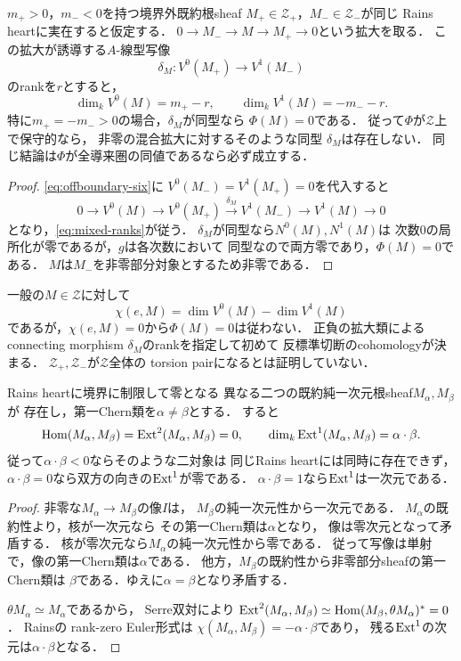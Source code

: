 \begin{proposition}[正負の混合拡大と相殺]
\label{prop:mixed-sign-cancellation}
$m_+>0$，$m_-<0$を持つ境界外既約根sheaf
$M_+\in\mathcal Z_+$，$M_-\in\mathcal Z_-$が同じ
Rains heartに実在すると仮定する．
$0\to M_-\to M\to M_+\to0$という拡大を取る．
この拡大が誘導する$A$-線型写像
\[
 \delta_M:V^0(M_+)\longrightarrow V^1(M_-)
\]
のrankを$r$とすると，
\begin{equation}\label{eq:mixed-ranks}
 \dim_kV^0(M)=m_+-r,\qquad
 \dim_kV^1(M)=-m_--r .
\end{equation}
特に$m_+=-m_->0$の場合，$\delta_M$が同型なら
$\Phi(M)=0$である．
従って$\Phi$が$\mathcal Z$上で保守的なら，
非零の混合拡大に対するそのような同型
$\delta_M$は存在しない．
同じ結論は$\Phi$が全導来圏の同値であるなら必ず成立する．
\end{proposition}
\begin{proof}
\eqref{eq:offboundary-six}に
$V^0(M_-)=V^1(M_+)=0$を代入すると
\[
0\to V^0(M)\to V^0(M_+)
\xrightarrow{\delta_M}V^1(M_-)\to V^1(M)\to0
\]
となり，\eqref{eq:mixed-ranks}が従う．
$\delta_M$が同型なら$N^0(M),N^1(M)$は
次数$0$の局所化が零であるが，$g$は各次数において
同型なので両方零であり，$\Phi(M)=0$である．
$M$は$M_-$を非零部分対象とするため非零である．
\end{proof}

\begin{remark}[Euler標数だけでは検出できない]
一般の$M\in\mathcal Z$に対して
\[
 \chi(e,M)=\dim V^0(M)-\dim V^1(M)
\]
であるが，$\chi(e,M)=0$から$\Phi(M)=0$は従わない．
正負の拡大類によるconnecting morphism
$\delta_M$のrankを指定して初めて
反標準切断のcohomologyが決まる．
$\mathcal Z_+,\mathcal Z_-$が$\mathcal Z$全体の
torsion pairになるとは証明していない．
\end{remark}

\begin{proposition}[根系からの共鳴交叉制約]
\label{prop:root-intersection}
Rains heartに境界に制限して零となる
異なる二つの既約純一次元根sheaf$M_\alpha,M_\beta$が
存在し，第一Chern類を$\alpha\ne\beta$とする．
すると
\[
 \operatorname{Hom}(M_\alpha,M_\beta)=\operatorname{Ext}^2(M_\alpha,M_\beta)=0,
 \qquad
 \dim_k\operatorname{Ext}^1(M_\alpha,M_\beta)=\alpha\cdot\beta.
\]
従って$\alpha\cdot\beta<0$ならそのような二対象は
同じRains heartには同時に存在できず，
$\alpha\cdot\beta=0$なら双方の向きの$\operatorname{Ext}^1$が零である．
$\alpha\cdot\beta=1$なら$\operatorname{Ext}^1$は一次元である．
\end{proposition}
\begin{proof}
非零な$M_\alpha\to M_\beta$の像$I$は，
$M_\beta$の純一次元性から一次元である．
$M_\alpha$の既約性より，核が一次元なら
その第一Chern類は$\alpha$となり，
像は零次元となって矛盾する．
核が零次元なら$M_\alpha$の純一次元性から零である．
従って写像は単射で，像の第一Chern類は$\alpha$である．
他方，$M_\beta$の既約性から非零部分sheafの第一Chern類は
$\beta$である．ゆえに$\alpha=\beta$となり矛盾する．

$\theta M_\alpha\simeq M_\alpha$であるから，
Serre双対により
$\operatorname{Ext}^2(M_\alpha,M_\beta)
 \simeq\operatorname{Hom}(M_\beta,\theta M_\alpha)^*=0$．
Rains\cite[Corollary 7.13, (7.4)]{RainsBirational}の
rank-zero Euler形式は
$\chi(M_\alpha,M_\beta)=-\alpha\cdot\beta$であり，
残る$\operatorname{Ext}^1$の次元は$\alpha\cdot\beta$となる．
\end{proof}


